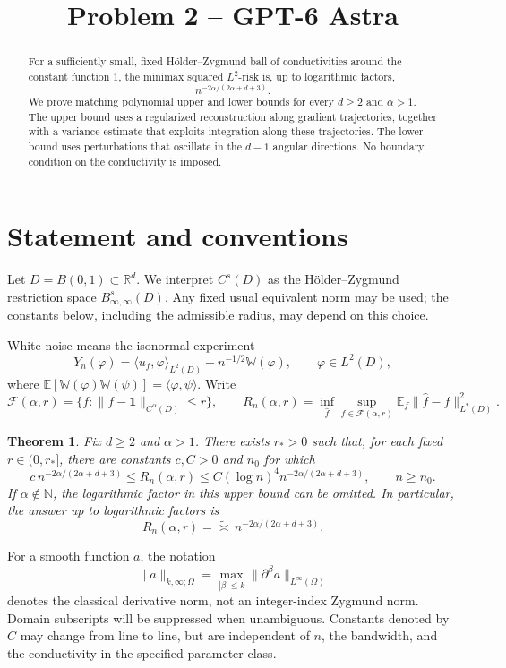 \documentclass[11pt]{article}
\title{Problem 2 -- GPT-6 Astra}
\author{}
\date{}
\newtheorem{theorem}{Theorem}[section]
\theoremstyle{remark}
\newcommand{\R}{\mathbb R}
\newcommand{\E}{\mathbb E}
\newcommand{\one}{\mathbf 1}
\newcommand{\cF}{\mathcal F}
\begin{document}
\maketitle

\begin{abstract}
For a sufficiently small, fixed H\"older--Zygmund ball of conductivities
around the constant function \(1\), the minimax squared \(L^2\)-risk is,
up to logarithmic factors,
\[
n^{-2\alpha/(2\alpha+d+3)}.
\]
We prove matching polynomial upper and lower bounds for every \(d\geq2\)
and \(\alpha>1\). The upper bound uses a regularized reconstruction along
gradient trajectories, together with a variance estimate that exploits
integration along these trajectories. The lower bound uses perturbations
that oscillate in the \(d-1\) angular directions. No boundary condition
on the conductivity is imposed.
\end{abstract}

\section{Statement and conventions}

Let \(D=B(0,1)\subset\R^d\). We interpret \(C^s(D)\) as the
H\"older--Zygmund restriction space \(B^s_{\infty,\infty}(D)\).
Any fixed usual equivalent norm may be used; the constants below,
including the admissible radius, may depend on this choice.

White noise means the isonormal experiment
\[
Y_n(\varphi)=\langle u_f,\varphi\rangle_{L^2(D)}
+n^{-1/2}\mathbb W(\varphi),\qquad \varphi\in L^2(D),
\]
where
\(\E[\mathbb W(\varphi)\mathbb W(\psi)]=\langle\varphi,\psi\rangle\).
Write
\[
\cF(\alpha,r)=
\{f:\|f-\one\|_{C^\alpha(D)}\leq r\},
\qquad
R_n(\alpha,r)=
\inf_{\widehat f}\sup_{f\in\cF(\alpha,r)}
\E_f\|\widehat f-f\|_{L^2(D)}^2.
\]

\begin{theorem}\label{thm:main}
Fix \(d\geq2\) and \(\alpha>1\). There exists \(r_*>0\) such that,
for each fixed \(r\in(0,r_*]\), there are constants
\(c,C>0\) and \(n_0\) for which
\[
c\,n^{-2\alpha/(2\alpha+d+3)}
\leq R_n(\alpha,r)
\leq
C(\log n)^4 n^{-2\alpha/(2\alpha+d+3)},
\qquad n\geq n_0.
\]
If \(\alpha\notin\mathbb N\), the logarithmic factor in this upper bound
can be omitted. In particular, the answer up to logarithmic factors is
\[
\boxed{\displaystyle
R_n(\alpha,r)=\widetilde{\asymp}\,
n^{-2\alpha/(2\alpha+d+3)}.}
\]
\end{theorem}

For a smooth function \(a\), the notation
\[
\|a\|_{k,\infty;\Omega}
=\max_{|\beta|\leq k}\|\partial^\beta a\|_{L^\infty(\Omega)}
\]
denotes the classical derivative norm, not an integer-index Zygmund
norm. Domain subscripts will be suppressed when unambiguous.
Constants denoted by \(C\) may change from line to line, but are
independent of \(n\), the bandwidth, and the conductivity in the
specified parameter class.
\end{document}
